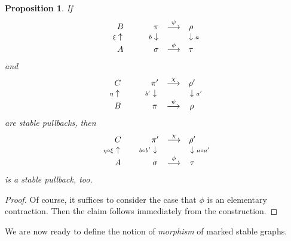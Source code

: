 \documentclass[11pt]{amsart}
\newtheorem{prop}{Proposition}[section]
\theoremstyle{definition}
\theoremstyle{remark}
\newenvironment{pf}{\begin{proof}}{\end{proof}}
\newcommand{\comp}{\mathbin{{\scriptstyle\circ}}}
\newcommand{\ldiag}[1]
       {\makebox[0cm]{\({\scriptstyle#1}\downarrow\phantom{\scriptstyle#1}\)}}
\newcommand{\ldiagup}[1]
       {\makebox[0cm]{\({\scriptstyle#1}\uparrow\phantom{\scriptstyle#1}\)}}
\newcommand{\rdiag}[1]
       {\makebox[0cm]{\(\phantom{\scriptstyle#1}\downarrow{\scriptstyle#1}\)}}
\theoremstyle{plain}
\theoremstyle{definition}
\theoremstyle{remark}
\begin{document}
\begin{prop} \label{cspcb}
If
\[
\begin{array}{ccccc}
B & & \pi & \stackrel{\psi}{\longrightarrow} & \rho \\
\ldiagup{\xi} & \phantom{\longrightarrow} & \ldiag{b} &  & \rdiag{a} \\
A & & \sigma & \stackrel{\phi}{\longrightarrow} & \tau
\end{array}
\]
and
\[
\begin{array}{ccccc}
C & & \pi' & \stackrel{\chi}{\longrightarrow} & \rho' \\
\ldiagup{\eta} & \phantom{\longrightarrow} & \ldiag{b'} &  & \rdiag{a'} \\
B & & \pi & \stackrel{\psi}{\longrightarrow} & \rho
\end{array}
\]
are stable pullbacks, then
\[
\begin{array}{ccccc}
C & & \pi' & \stackrel{\chi}{\longrightarrow} & \rho' \\
\ldiagup{\eta\comp\xi} & \phantom{\longrightarrow} & \ldiag{b\comp b'} &  &
\rdiag{a\comp a'} \\
A & & \sigma & \stackrel{\phi}{\longrightarrow} & \tau
\end{array}
\]
is a stable pullback, too.
\end{prop}
\begin{pf}
Of course, it suffices to consider the case that \(\phi\) is an elementary
contraction. Then the claim follows immediately
from the construction.
\end{pf}


We are now ready to define the notion of {\em morphism } of marked stable
graphs.
\end{document}
